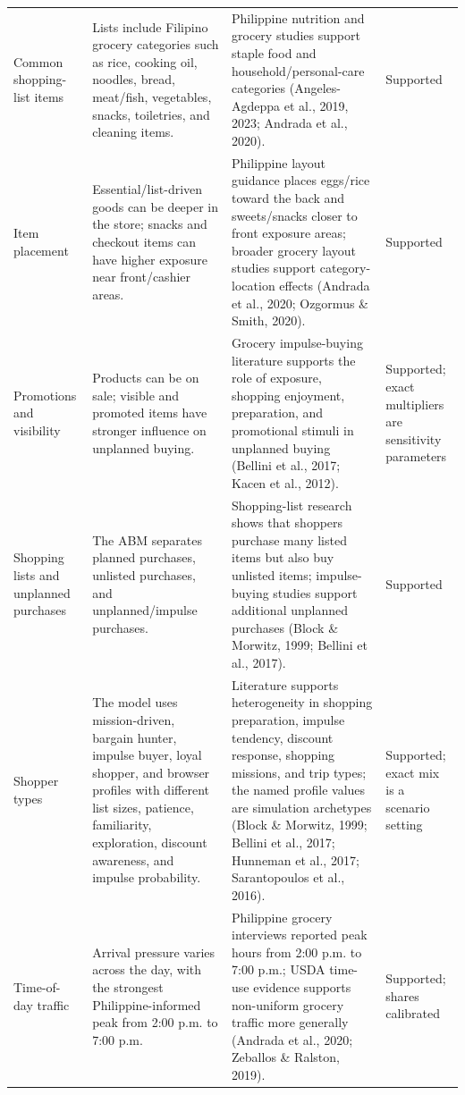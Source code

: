 \documentclass[12pt]{article}
\begin{document}
\begin{longtable}{>{\raggedright\arraybackslash}p{} >{\raggedright\arraybackslash}p{} >{\raggedright\arraybackslash}p{} >{\raggedright\arraybackslash}p{}}
Common shopping-list items & Lists include Filipino grocery categories such as rice, cooking oil, noodles, bread, meat/fish, vegetables, snacks, toiletries, and cleaning items. & Philippine nutrition and grocery studies support staple food and household/personal-care categories (Angeles-Agdeppa et al., 2019, 2023; Andrada et al., 2020). & Supported \\

Item placement & Essential/list-driven goods can be deeper in the store; snacks and checkout items can have higher exposure near front/cashier areas. & Philippine layout guidance places eggs/rice toward the back and sweets/snacks closer to front exposure areas; broader grocery layout studies support category-location effects (Andrada et al., 2020; Ozgormus \& Smith, 2020). & Supported \\

Promotions and visibility & Products can be on sale; visible and promoted items have stronger influence on unplanned buying. & Grocery impulse-buying literature supports the role of exposure, shopping enjoyment, preparation, and promotional stimuli in unplanned buying (Bellini et al., 2017; Kacen et al., 2012). & Supported; exact multipliers are sensitivity parameters \\

Shopping lists and unplanned purchases & The ABM separates planned purchases, unlisted purchases, and unplanned/impulse purchases. & Shopping-list research shows that shoppers purchase many listed items but also buy unlisted items; impulse-buying studies support additional unplanned purchases (Block \& Morwitz, 1999; Bellini et al., 2017). & Supported \\

Shopper types & The model uses mission-driven, bargain hunter, impulse buyer, loyal shopper, and browser profiles with different list sizes, patience, familiarity, exploration, discount awareness, and impulse probability. & Literature supports heterogeneity in shopping preparation, impulse tendency, discount response, shopping missions, and trip types; the named profile values are simulation archetypes (Block \& Morwitz, 1999; Bellini et al., 2017; Hunneman et al., 2017; Sarantopoulos et al., 2016). & Supported; exact mix is a scenario setting \\

Time-of-day traffic & Arrival pressure varies across the day, with the strongest Philippine-informed peak from 2:00 p.m. to 7:00 p.m. & Philippine grocery interviews reported peak hours from 2:00 p.m. to 7:00 p.m.; USDA time-use evidence supports non-uniform grocery traffic more generally (Andrada et al., 2020; Zeballos \& Ralston, 2019). & Supported; shares calibrated \\


\end{longtable}
\end{document}
